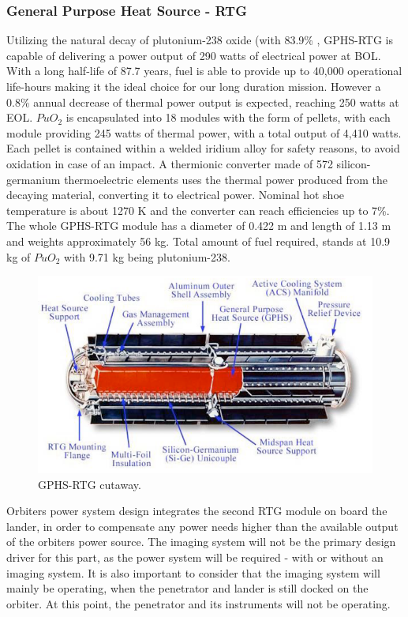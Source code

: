 \subsubsection*{General Purpose Heat Source - RTG} 
Utilizing the natural decay of plutonium-238 oxide (with 83.9\% , GPHS-RTG is capable of delivering a power output of 290 watts of electrical power at BOL. With a long half-life of 87.7 years, fuel is able to provide up to 40,000 operational life-hours making it the ideal choice for our long duration mission. However a 0.8\% annual decrease of thermal power output is expected, reaching 250 watts at EOL. $PuO_2$ is encapsulated into 18 modules with the form of pellets, with each module providing 245 watts of thermal power, with a total output of 4,410 watts. Each pellet is contained within a welded iridium alloy for safety reasons, to avoid oxidation in case of an impact. A thermionic converter made of 572 silicon-germanium thermoelectric elements uses the thermal power produced from the decaying material, converting it to electrical power. Nominal hot shoe temperature is about 1270 K and the converter can reach efficiencies up to 7\%. The whole GPHS-RTG module has a diameter of 0.422 m and length of 1.13 m and weights approximately 56 kg. Total amount of fuel required, stands at 10.9 kg of $PuO_2$ with 9.71 kg being plutonium-238.
\begin{figure}[H]
\centering
\includegraphics[scale=0.6]{figures/Orbiter/rtg.png}
\caption{GPHS-RTG cutaway. \cite{rtg}}
\label{fig:rtg}
\end{figure}
Orbiters power system design integrates the second RTG module on board the lander, in order to compensate any power needs higher than the available output of the orbiters power source. The imaging system will not be the primary design driver for this part, as the power system will be required - with or without an imaging system. It is also important to consider that the imaging system will mainly be operating, when the penetrator and lander is still docked on the orbiter. At this point, the penetrator and its instruments will not be operating.

